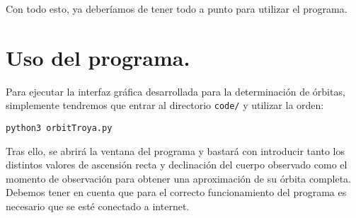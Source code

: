 Con todo esto, ya deberíamos de tener todo a punto para utilizar el programa.\\

\section{Uso del programa.}
Para ejecutar la interfaz gráfica desarrollada para la determinación de órbitas, simplemente tendremos que entrar al directorio \texttt{code/} y utilizar la orden:
\begin{lstlisting}[style=Console]
python3 orbitTroya.py
\end{lstlisting}

Tras ello, se abrirá la ventana del programa y bastará con introducir tanto los distintos valores de ascensión recta y declinación del cuerpo observado como el momento de observación para obtener una aproximación de su órbita completa.\\

Debemos tener en cuenta que para el correcto funcionamiento del programa es necesario que se esté conectado a internet.

